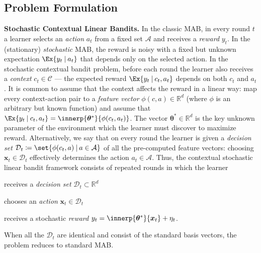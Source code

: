 \documentclass{article}
\renewcommand{\vec}[1]{\bm{#1}}
\newcommand{\defeq}{\coloneq}
\newcommand{\Real}{\mathds{R}}
\newcommand\given[1][\delimsize]{%
  \providecommand{\delimsize}{}
  \nonscript\:#1\vert\allowbreak\nonscript\:\mathopen{}
}
\newcommand{\A}{\mathcal{A}}
\newcommand{\C}{\mathcal{C}}
\newcommand{\D}{\mathcal{D}}
\renewcommand{\paragraph}[1]{\vspace{2pt}\noindent\textbf{#1}}
\begin{document}
\subsection{Problem Formulation}
\label{subsec:problem_formulation}
\paragraph{Stochastic Contextual Linear Bandits.}
In the classic MAB, in every round $t$ a learner selects an
\emph{action} $a_t$ from a fixed set $\A$ and receives a \emph{reward}
$y_t$.  In the (stationary) \emph{stochastic} MAB, the reward is noisy
with a fixed but unknown expectation $\Ex{y_t\given a_t}$ that depends
only on the selected action.  In the stochastic contextual bandit
problem, before each round the learner also receives a \emph{context}
$c_t\in\C$ --- the expected reward $\Ex{y_t\given c_t,a_t}$ depends on
both $c_t$ and $a_t$.  It is common to assume that the context affects
the reward in a linear way: map every context-action pair to a
\emph{feature vector} $\phi(c,a)\in\Real^d$ (where $\phi$ is an
arbitrary but known function) and assume that
$\Ex{y_t\given c_t,a_t} = \innerp{\vec\theta^*}{\phi(c_t,a_t)}$.  The
vector $\vec\theta^*\in\Real^d$ is the key unknown parameter of the
environment which the learner must discover to maximize reward.
Alternatively, we say that on every round the learner is given a
\emph{decision set} $\D_t \defeq \set{\phi(c_t,a)\given a\in\A}$ of
all the pre-computed feature vectors: choosing $\vec x_t\in\D_t$
effectively determines the action $a_t\in\A$.  Thus, the contextual
stochastic linear bandit framework consists of repeated rounds in
which the learner
\begin{enumerate*}[(i),before=\unskip{: },itemjoin={{; }},itemjoin*={{; and }}]
\item receives a \emph{decision set} $\mathcal{D}_t \subset \Real^d$
\item chooses an \emph{action} $\vec x_t \in \mathcal{D}_t$
\item receives a stochastic \emph{reward}
  $y_t = \innerp{\vec\theta^*}{\vec x_t} + \eta_t$.
\end{enumerate*}
When all the $\D_t$ are identical and consist of the standard basis
vectors, the problem reduces to standard MAB\@.
\end{document}
